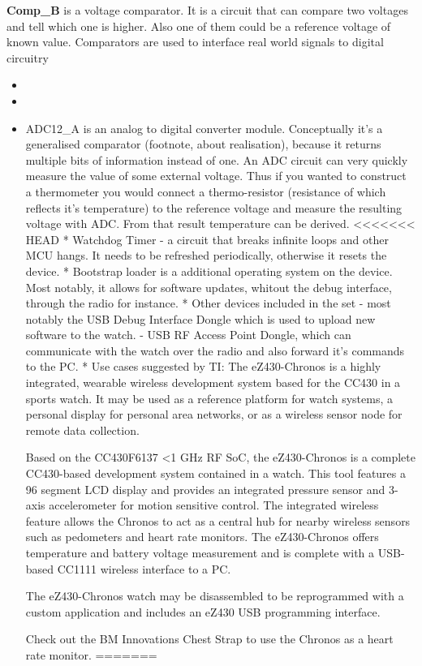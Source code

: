 {\bf Comp\_B} is a voltage comparator. It is a circuit that can
compare two voltages and tell which one is higher. Also one of them
could be a reference voltage of known value. Comparators are used to
interface real world signals to digital circuitry
\begin{itemize}
  \item 
 \item 
 \item ADC12\_A is an analog to digital converter module. Conceptually
     it's a generalised comparator (footnote, about realisation),
     because it returns multiple bits of information instead of one.
     An ADC circuit can very quickly measure the value of some
     external voltage. Thus if you wanted to construct a thermometer
     you would connect a thermo-resistor (resistance of which reflects
     it's temperature) to the reference voltage and measure the
     resulting voltage with ADC. From that result temperature can be
     derived.
<<<<<<< HEAD
     * Watchdog Timer - a circuit that breaks infinite loops and other
     MCU hangs. It needs to be refreshed periodically, otherwise it
     resets the device.
     * Bootstrap loader is a additional operating system on the
     device. Most notably, it allows for software updates, whitout the
     debug interface, through the radio for
     instance.
  * Other devices included in the set
    - most notably the USB Debug Interface Dongle which is used to
    upload new software to the watch.
    - USB RF Access Point Dongle, which can communicate with the watch
    over the radio and also forward it's commands to the PC.
  * Use cases suggested by TI:
  The eZ430-Chronos is a highly integrated, wearable wireless
  development system based for the CC430 in a sports watch. It may be
  used as a reference platform for watch systems, a personal display
  for personal area networks, or as a wireless sensor node for remote
  data collection.

  Based on the CC430F6137 <1 GHz RF SoC, the eZ430-Chronos is a
  complete CC430-based development system contained in a watch. This
  tool features a 96 segment LCD display and provides an integrated
  pressure sensor and 3-axis accelerometer for motion sensitive
  control. The integrated wireless feature allows the Chronos to act
  as a central hub for nearby wireless sensors such as pedometers and
  heart rate monitors. The eZ430-Chronos offers temperature and
  battery voltage measurement and is complete with a USB-based CC1111
  wireless interface to a PC.

  The eZ430-Chronos watch may be disassembled to be reprogrammed with
  a custom application and includes an eZ430 USB programming
  interface.

  Check out the BM Innovations Chest Strap to use the Chronos as a
  heart rate monitor.
=======
\end{itemize}

